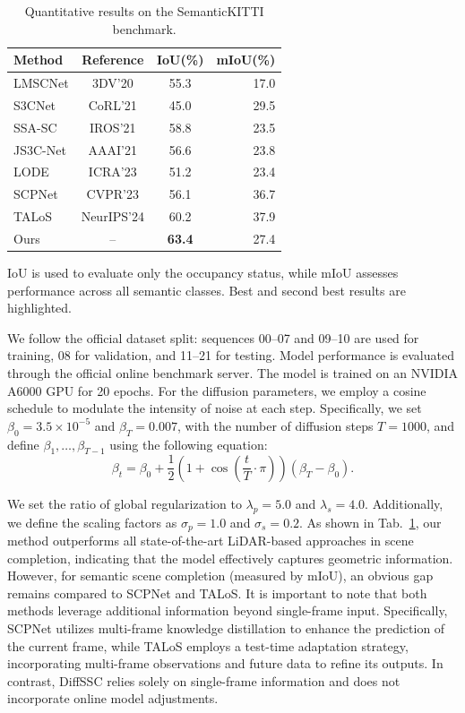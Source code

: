 \documentclass[conference]{IEEEtran}
\begin{document}
\begin{table}[htbp]
  \centering
  \caption{Quantitative results on the SemanticKITTI benchmark.}
  \label{tab:kitti}
  \begin{tabular}{lccr}
    \toprule
    Method & Reference & IoU(\%) & mIoU(\%) \\
    \midrule
    LMSCNet \cite{jbehley2011}   & 3DV'20     & 55.3 & 17.0 \\
    S3CNet \cite{xyang2025}   & CoRL'21    & 45.0 & 29.5 \\
    SSA-SC \cite{wwu2022}   & IROS'21    & 58.8 & 23.5 \\
    JS3C-Net \cite{hzeng2025} & AAAI'21    & 56.6 & 23.8 \\
    LODE \cite{wwu2025}     & ICRA'23    & 51.2 & 23.4 \\
    SCPNet \cite{knakashimaandr2025}   & CVPR'23    & 56.1 & 36.7 \\
    TALoS \cite{yli}    & NeurIPS'24 & 60.2 & 37.9 \\
    \midrule
    Ours          & --         & \textbf{63.4} & 27.4 \\
    \bottomrule
  \end{tabular}

  \smallskip
  \footnotesize{IoU is used to evaluate only the occupancy status, while mIoU assesses performance across all semantic classes. Best and second best results are highlighted.}
\end{table}

We follow the official dataset split: sequences 00--07 and 09--10 are used for training, 08 for validation, and 11--21 for testing.
Model performance is evaluated through the official online benchmark server.
The model is trained on an NVIDIA A6000 GPU for 20 epochs.
For the diffusion parameters, we employ a cosine schedule to modulate the intensity of noise at each step.
Specifically, we set $\beta_0 = 3.5 \times 10^{-5}$ and $\beta_T = 0.007$, with the number of diffusion steps $T = 1000$, and define $\beta_1, \ldots, \beta_{T-1}$ using the following equation:
\begin{equation}
  \beta_t = \beta_0 + \frac{1}{2}\left(1 + \cos\!\left(\frac{t}{T} \cdot \pi\right)\right)(\beta_T - \beta_0).
  \label{eq:cosine}
\end{equation}

We set the ratio of global regularization to $\lambda_p = 5.0$ and $\lambda_s = 4.0$.
Additionally, we define the scaling factors as $\sigma_p = 1.0$ and $\sigma_s = 0.2$.
As shown in Tab.~\ref{tab:kitti}, our method outperforms all state-of-the-art LiDAR-based approaches in scene completion, indicating that the model effectively captures geometric information.
However, for semantic scene completion (measured by mIoU), an obvious gap remains compared to SCPNet and TALoS.
It is important to note that both methods leverage additional information beyond single-frame input.
Specifically, SCPNet utilizes multi-frame knowledge distillation to enhance the prediction of the current frame, while TALoS employs a test-time adaptation strategy, incorporating multi-frame observations and future data to refine its outputs.
In contrast, DiffSSC relies solely on single-frame information and does not incorporate online model adjustments.
\end{document}
